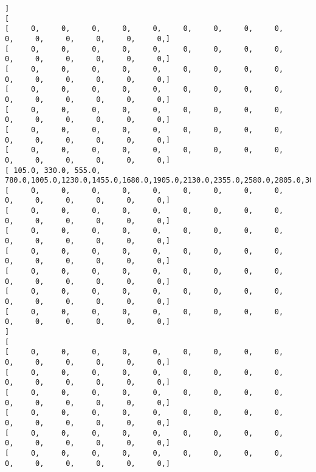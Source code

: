 \documentclass[11pt]{article}
\begin{document}
\begin{Verbatim}[commandchars=\\\{\}]
]
[
[      0,      0,      0,      0,      0,      0,      0,      0,      0,      0,      0,      0,      0,      0,      0, ]
[      0,      0,      0,      0,      0,      0,      0,      0,      0,      0,      0,      0,      0,      0,      0, ]
[      0,      0,      0,      0,      0,      0,      0,      0,      0,      0,      0,      0,      0,      0,      0, ]
[      0,      0,      0,      0,      0,      0,      0,      0,      0,      0,      0,      0,      0,      0,      0, ]
[      0,      0,      0,      0,      0,      0,      0,      0,      0,      0,      0,      0,      0,      0,      0, ]
[      0,      0,      0,      0,      0,      0,      0,      0,      0,      0,      0,      0,      0,      0,      0, ]
[      0,      0,      0,      0,      0,      0,      0,      0,      0,      0,      0,      0,      0,      0,      0, ]
[  105.0,  330.0,  555.0,  780.0, 1005.0, 1230.0, 1455.0, 1680.0, 1905.0, 2130.0, 2355.0, 2580.0, 2805.0, 3030.0, 3255.0, ]
[      0,      0,      0,      0,      0,      0,      0,      0,      0,      0,      0,      0,      0,      0,      0, ]
[      0,      0,      0,      0,      0,      0,      0,      0,      0,      0,      0,      0,      0,      0,      0, ]
[      0,      0,      0,      0,      0,      0,      0,      0,      0,      0,      0,      0,      0,      0,      0, ]
[      0,      0,      0,      0,      0,      0,      0,      0,      0,      0,      0,      0,      0,      0,      0, ]
[      0,      0,      0,      0,      0,      0,      0,      0,      0,      0,      0,      0,      0,      0,      0, ]
[      0,      0,      0,      0,      0,      0,      0,      0,      0,      0,      0,      0,      0,      0,      0, ]
[      0,      0,      0,      0,      0,      0,      0,      0,      0,      0,      0,      0,      0,      0,      0, ]
]
[
[      0,      0,      0,      0,      0,      0,      0,      0,      0,      0,      0,      0,      0,      0,      0, ]
[      0,      0,      0,      0,      0,      0,      0,      0,      0,      0,      0,      0,      0,      0,      0, ]
[      0,      0,      0,      0,      0,      0,      0,      0,      0,      0,      0,      0,      0,      0,      0, ]
[      0,      0,      0,      0,      0,      0,      0,      0,      0,      0,      0,      0,      0,      0,      0, ]
[      0,      0,      0,      0,      0,      0,      0,      0,      0,      0,      0,      0,      0,      0,      0, ]
[      0,      0,      0,      0,      0,      0,      0,      0,      0,      0,      0,      0,      0,      0,      0, ]

\end{Verbatim}
\end{document}
